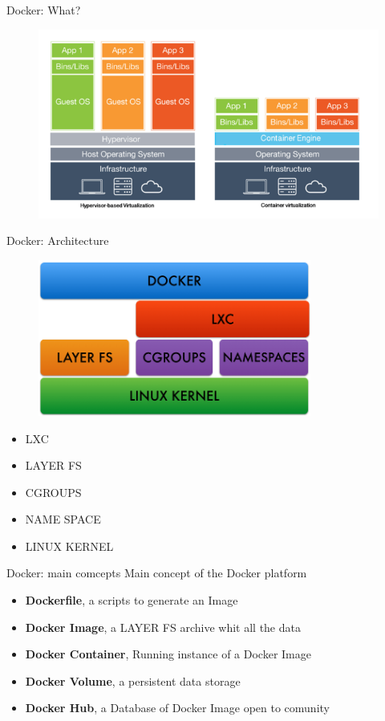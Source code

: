 \documentclass{beamer}
\begin{document}
  \begin{frame}{Docker: What?}
    \begin{figure}
      \includegraphics[width=1\textwidth]{img/docker_vs_vm.png}
    \end{figure}
  \end{frame}

  \begin{frame}{Docker: Architecture}
    \begin{figure}
      \includegraphics[width=0.8\textwidth]{img/docker_achitecture_crop.png}
    \end{figure}
    \begin{itemize}
      \item LXC %
      \item LAYER FS
      \item CGROUPS
      \item NAME SPACE
      \item LINUX KERNEL
    \end{itemize}
  \end{frame}

  \begin{frame}{Docker: main comcepts}
    Main concept of the Docker platform
    \begin{itemize}
      \item \textbf{Dockerfile}, a scripts to generate an Image
      \item \textbf{Docker Image}, a LAYER FS archive whit all the data
      \item \textbf{Docker Container}, Running instance of a Docker Image
      \item \textbf{Docker Volume}, a persistent data storage
      \item \textbf{Docker Hub}, a Database of Docker Image open to comunity
    \end{itemize}
  \end{frame}
\end{document}
